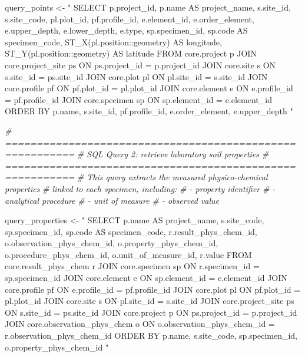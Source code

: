 \documentclass[
  10pt,
  b5paper,
  oneside]{book}
\newenvironment{Shaded}{\begin{snugshade}}{\end{snugshade}}
\newcommand{\CommentTok}[1]{\textcolor[rgb]{0.56,0.35,0.01}{\textit{#1}}}
\newcommand{\NormalTok}[1]{#1}
\newcommand{\OtherTok}[1]{\textcolor[rgb]{0.56,0.35,0.01}{#1}}
\newcommand{\StringTok}[1]{\textcolor[rgb]{0.31,0.60,0.02}{#1}}
\begin{document}
\begin{Shaded}
\begin{Highlighting}[]
\NormalTok{query\_points }\OtherTok{\textless{}{-}} \StringTok{"}
\StringTok{SELECT}
\StringTok{  p.project\_id,}
\StringTok{  p.name AS project\_name,}
\StringTok{  s.site\_id,}
\StringTok{  s.site\_code,}
\StringTok{  pl.plot\_id,}
\StringTok{  pf.profile\_id,}
\StringTok{  e.element\_id,}
\StringTok{  e.order\_element,}
\StringTok{  e.upper\_depth,}
\StringTok{  e.lower\_depth,}
\StringTok{  e.type,}
\StringTok{  sp.specimen\_id,}
\StringTok{  sp.code AS specimen\_code,}
\StringTok{  ST\_X(pl.position::geometry) AS longitude,}
\StringTok{  ST\_Y(pl.position::geometry) AS latitude}
\StringTok{FROM core.project p}
\StringTok{JOIN core.project\_site ps}
\StringTok{  ON ps.project\_id = p.project\_id}
\StringTok{JOIN core.site s}
\StringTok{  ON s.site\_id = ps.site\_id}
\StringTok{JOIN core.plot pl}
\StringTok{  ON pl.site\_id = s.site\_id}
\StringTok{JOIN core.profile pf}
\StringTok{  ON pf.plot\_id = pl.plot\_id}
\StringTok{JOIN core.element e}
\StringTok{  ON e.profile\_id = pf.profile\_id}
\StringTok{JOIN core.specimen sp}
\StringTok{  ON sp.element\_id = e.element\_id}
\StringTok{ORDER BY}
\StringTok{  p.name,}
\StringTok{  s.site\_id,}
\StringTok{  pf.profile\_id,}
\StringTok{  e.order\_element,}
\StringTok{  e.upper\_depth}
\StringTok{"}

\CommentTok{\# =========================================================}
\CommentTok{\# SQL Query 2: retrieve laboratory soil properties}
\CommentTok{\# =========================================================}
\CommentTok{\# This query extracts the measured physico{-}chemical properties}
\CommentTok{\# linked to each specimen, including:}
\CommentTok{\# {-} property identifier}
\CommentTok{\# {-} analytical procedure}
\CommentTok{\# {-} unit of measure}
\CommentTok{\# {-} observed value}

\NormalTok{query\_properties }\OtherTok{\textless{}{-}} \StringTok{"}
\StringTok{SELECT}
\StringTok{  p.name AS project\_name,}
\StringTok{  s.site\_code,}
\StringTok{  sp.specimen\_id,}
\StringTok{  sp.code AS specimen\_code,}
\StringTok{  r.result\_phys\_chem\_id,}
\StringTok{  o.observation\_phys\_chem\_id,}
\StringTok{  o.property\_phys\_chem\_id,}
\StringTok{  o.procedure\_phys\_chem\_id,}
\StringTok{  o.unit\_of\_measure\_id,}
\StringTok{  r.value}
\StringTok{FROM core.result\_phys\_chem r}
\StringTok{JOIN core.specimen sp}
\StringTok{  ON r.specimen\_id = sp.specimen\_id}
\StringTok{JOIN core.element e}
\StringTok{  ON sp.element\_id = e.element\_id}
\StringTok{JOIN core.profile pf}
\StringTok{  ON e.profile\_id = pf.profile\_id}
\StringTok{JOIN core.plot pl}
\StringTok{  ON pf.plot\_id = pl.plot\_id}
\StringTok{JOIN core.site s}
\StringTok{  ON pl.site\_id = s.site\_id}
\StringTok{JOIN core.project\_site ps}
\StringTok{  ON s.site\_id = ps.site\_id}
\StringTok{JOIN core.project p}
\StringTok{  ON ps.project\_id = p.project\_id}
\StringTok{JOIN core.observation\_phys\_chem o}
\StringTok{  ON o.observation\_phys\_chem\_id = r.observation\_phys\_chem\_id}
\StringTok{ORDER BY}
\StringTok{  p.name,}
\StringTok{  s.site\_code,}
\StringTok{  sp.specimen\_id,}
\StringTok{  o.property\_phys\_chem\_id}
\StringTok{"}


\end{Highlighting}
\end{Shaded}
\end{document}
